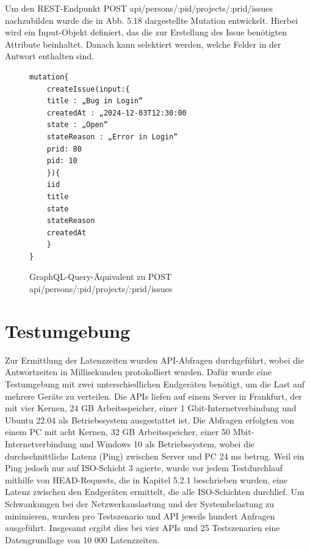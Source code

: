\noindent
Um den REST-Endpunkt \colorbox{gray!20}{POST api/persons/:pid/projects/:prid/issues} nachzubilden wurde die in Abb. 5.18 dargestellte Mutation entwickelt. Hierbei wird ein Input-Objekt definiert, das die zur Erstellung des Issue benötigten Attribute beinhaltet. Danach kann selektiert werden, welche Felder in der Antwort enthalten sind.
\begin{figure}[H]
\begin{center}
\begin{BVerbatim}
mutation{
    createIssue(input:{
	title : „Bug in Login“
	createdAt : „2024-12-03T12:30:00
	state : „Open“
	stateReason : „Error in Login“
	prid: 80
	pid: 10
	}){
	iid
	title
	state
	stateReason
	createdAt
    }
}
\end{BVerbatim}
\end{center}
\caption{GraphQL-Query-Äquivalent zu POST api/persons/:pid/projects/:prid/issues}
\end{figure}

\label{sec:graphql}

\section{Testumgebung} %
\label{sec:testumgebung}
Zur Ermittlung der Latenzzeiten wurden API-Abfragen durchgeführt, wobei die Antwortzeiten in Millisekunden protokolliert wurden. Dafür wurde eine Testumgebung mit zwei unterschiedlichen Endgeräten benötigt, um die Last auf mehrere Geräte zu verteilen. Die APIs liefen auf einem Server in Frankfurt, der mit vier Kernen, 24 GB Arbeitsspeicher, einer 1 Gbit-Internetverbindung und Ubuntu 22.04 als Betriebssystem ausgestattet ist.
\newline
Die Abfragen erfolgten von einem PC mit acht Kernen, 32 GB Arbeitsspeicher, einer 50 Mbit- Internetverbindung und Windows 10 als Betriebssystem, wobei die durchschnittliche Latenz (Ping) zwischen Server und PC 24 ms betrug. Weil ein Ping jedoch nur auf ISO-Schicht 3 agierte, wurde vor jedem Testdurchlauf mithilfe von HEAD-Requests, die in Kapitel 5.2.1 beschrieben wurden, eine Latenz zwischen den Endgeräten ermittelt, die alle ISO-Schichten durchlief. Um Schwankungen bei der Netzwerkauslastung und der Systembelastung zu minimieren, wurden pro Testszenario und API jeweils hundert Anfragen ausgeführt. Insgesamt ergibt dies bei vier APIs und 25 Testszenarien eine Datengrundlage von 10 000 Latenzzeiten.




